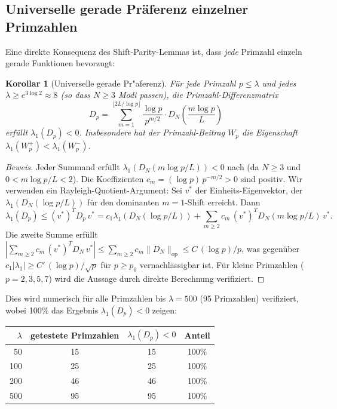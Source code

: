 ﻿\documentclass[12pt,a4paper]{article}
\newtheorem{corollary}[theorem]{Korollar}
\theoremstyle{definition}
\theoremstyle{remark}
\begin{document}
\subsection{Universelle gerade Pr\"aferenz einzelner Primzahlen}

Eine direkte Konsequenz des Shift-Parity-Lemmas ist, dass \emph{jede} Primzahl einzeln gerade Funktionen bevorzugt:

\begin{corollary}[Universelle gerade Pr"aferenz]
\label{cor:universal}
Für jede Primzahl $p \leq \lambda$ und jedes $\lambda \geq e^{3\log 2} \approx 8$ (so dass $N \geq 3$ Modi passen), die Primzahl-Differenzmatrix
\[
  D_p = \sum_{m=1}^{\lfloor 2L/\log p \rfloor} \frac{\log p}{p^{m/2}} \cdot D_N\!\left(\frac{m\log p}{L}\right)
\]
erfüllt $\lambda_1(D_p) < 0$. Insbesondere hat der Primzahl-Beitrag $W_p$ die Eigenschaft $\lambda_1(W_p^+) < \lambda_1(W_p^-)$.
\end{corollary}

\begin{proof}[Beweis]
Jeder Summand erfüllt $\lambda_1(D_N(m\log p/L)) < 0$ nach  (da $N \geq 3$ und $0 < m\log p/L < 2$). Die Koeffizienten $c_m = (\log p)\,p^{-m/2} > 0$ sind positiv. Wir verwenden ein Rayleigh-Quotient-Argument: Sei $v^*$ der Einheits-Eigenvektor, der $\lambda_1(D_N(\log p/L))$ für den dominanten $m = 1$-Shift erreicht. Dann
\[
  \lambda_1(D_p) \leq (v^*)^T D_p\, v^* = c_1 \lambda_1(D_N(\log p/L)) + \sum_{m \geq 2} c_m\, (v^*)^T D_N(m\log p/L)\, v^*.
\]
Die zweite Summe erfüllt $|\sum_{m \geq 2} c_m\, (v^*)^T D_N\, v^*| \leq \sum_{m \geq 2} c_m \|D_N\|_{\mathrm{op}} \leq C\,(\log p)/p$, was gegenüber $c_1 |\lambda_1| \geq C'\,(\log p)/\sqrt{p}$ für $p \geq p_0$ vernachlässigbar ist. Für kleine Primzahlen ($p = 2, 3, 5, 7$) wird die Aussage durch direkte Berechnung verifiziert.
\end{proof}

Dies wird numerisch für alle Primzahlen bis $\lambda = 500$ (95 Primzahlen) verifiziert, wobei 100\% das Ergebnis $\lambda_1(D_p) < 0$ zeigen:

\begin{center}
\renewcommand{\arraystretch}{1.15}
\begin{tabular}{r|c|c|c}
$\lambda$ & getestete Primzahlen & $\lambda_1(D_p) < 0$ & Anteil \\\hline
50 & 15 & 15 & 100\% \\
100 & 25 & 25 & 100\% \\
200 & 46 & 46 & 100\% \\
500 & 95 & 95 & 100\%
\end{tabular}
\end{center}
\end{document}
